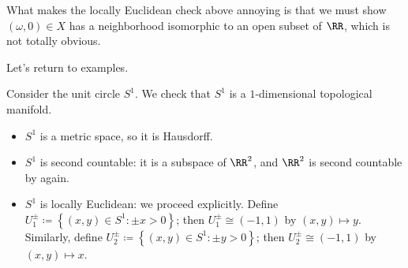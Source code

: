 \documentclass[../notes.tex]{subfiles}
\begin{document}
\begin{remark}
	What makes the locally Euclidean check above annoying is that we must show $(\omega,0)\in X$ has a neighborhood isomorphic to an open subset of $\RR$, which is not totally obvious.
\end{remark}
Let's return to examples.
\begin{example} \label{ex:s1-top-man}
	Consider the unit circle $S^1$. We check that $S^1$ is a $1$-dimensional topological manifold.
	\begin{itemize}
		\item $S^1$ is a metric space, so it is Hausdorff.
		\item $S^1$ is second countable: it is a subspace of $\RR^2$, and $\RR^2$ is second countable by  again.
		\item $S^1$ is locally Euclidean: we proceed explicitly. Define $U_1^\pm\coloneqq\left\{(x,y)\in S^1:\pm x>0\right\}$; then $U_1^\pm\cong(-1,1)$ by $(x,y)\mapsto y$. Similarly, define $U_2^\pm\coloneqq\left\{(x,y)\in S^1:\pm y>0\right\}$; then $U_2^\pm\cong(-1,1)$ by $(x,y)\mapsto x$.
	\end{itemize}
\end{example}
\end{document}
